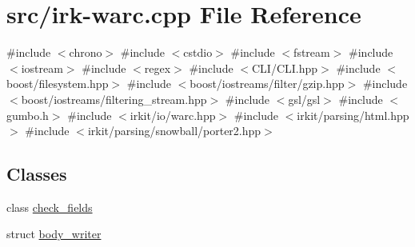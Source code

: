 \hypertarget{irk-warc_8cpp}{}\section{src/irk-\/warc.cpp File Reference}
\label{irk-warc_8cpp}
{\ttfamily \#include $<$chrono$>$}\newline
{\ttfamily \#include $<$cstdio$>$}\newline
{\ttfamily \#include $<$fstream$>$}\newline
{\ttfamily \#include $<$iostream$>$}\newline
{\ttfamily \#include $<$regex$>$}\newline
{\ttfamily \#include $<$C\+L\+I/\+C\+L\+I.\+hpp$>$}\newline
{\ttfamily \#include $<$boost/filesystem.\+hpp$>$}\newline
{\ttfamily \#include $<$boost/iostreams/filter/gzip.\+hpp$>$}\newline
{\ttfamily \#include $<$boost/iostreams/filtering\+\_\+stream.\+hpp$>$}\newline
{\ttfamily \#include $<$gsl/gsl$>$}\newline
{\ttfamily \#include $<$gumbo.\+h$>$}\newline
{\ttfamily \#include $<$irkit/io/warc.\+hpp$>$}\newline
{\ttfamily \#include $<$irkit/parsing/html.\+hpp$>$}\newline
{\ttfamily \#include $<$irkit/parsing/snowball/porter2.\+hpp$>$}\newline
\subsection*{Classes}
\begin{DoxyCompactItemize}
\item 
class \mbox{\hyperlink{classcheck__fields}{check\+\_\+fields}}
\item 
struct \mbox{\hyperlink{structbody__writer}{body\+\_\+writer}}
\end{DoxyCompactItemize}
